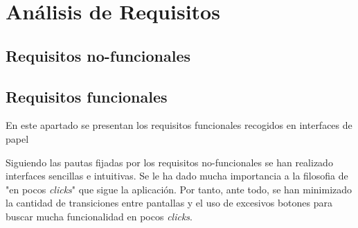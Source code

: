 
\chapter{Análisis de Requisitos}
\label{analisis-de-requisitos}

\section{Requisitos no-funcionales}
\label{analisis-de-requisitos:no-funcionales}



\section{Requisitos funcionales}
\label{analisis-de-requisitos:funcionales}

En este apartado se presentan los requisitos funcionales recogidos en interfaces de papel

Siguiendo las pautas fijadas por los requisitos no-funcionales se han realizado interfaces sencillas e intuitivas. Se le ha dado mucha importancia a la filosofia de "en pocos \textit{clicks}" que sigue la aplicación. Por tanto, ante todo, se han minimizado la cantidad de transiciones entre pantallas y el uso de excesivos botones para buscar mucha funcionalidad en pocos \textit{clicks}.\\

